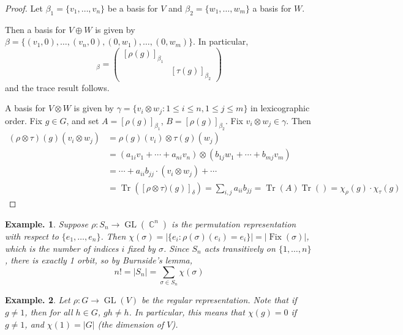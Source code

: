 \documentclass[11pt, a4paper]{memoir}
\DeclareMathOperator{\C}{{\mathbb{C}}}
\theoremstyle{change}
\theoremstyle{plain}
\theoremstyle{nonumberplain}
\newtheorem{example}{Example.}
\newtheorem{proof}{Proof}
\DeclareMathOperator{\Fix}{Fix}
\DeclareMathOperator{\GL}{GL}
\DeclareMathOperator{\Tr}{Tr}
\numberwithin{equation}{section}
\begin{document}
\begin{proof}
    Let $\beta_1=\{v_1,\ldots,v_n\}$ be a basis for $V$ and $\beta_2=\{w_1,\ldots,w_m\}$ a basis for $W$.

    Then a basis for $V\oplus W$ is given by $\beta=\{(v_1,0),\ldots,(v_n,0),(0,w_1),\ldots,(0,w_m)\}$.
    In particular,
    \begin{equation*}
        [(\rho\oplus\tau)(g)]_\beta=
        \begin{pmatrix}
            [\rho(g)]_{\beta_1} & \\
                                & [\tau(g)]_{\beta_2}
        \end{pmatrix}
    \end{equation*}
    and the trace result follows.

    A basis for $V\otimes W$ is given by $\gamma=\{v_i\otimes w_j:1\leq i\leq n,1\leq j\leq m\}$ in lexicographic order.
    Fix $g\in G$, and set $A=[\rho(g)]_{\beta_1}$, $B=[\rho(g)]_{\beta_2}$.
    Fix $v_i\otimes w_j\in\gamma$.
    Then
    \begin{align*}
        (\rho\otimes\tau)(g)(v_i\otimes w_j)&=\rho(g)(v_i)\otimes\tau(g)(w_j)\\
                                            &= (a_{1i}v_1+\cdots+a_{ni}v_n)\otimes(b_{1j}w_1+\cdots+b_{mj}v_m)\\
                                            &= \cdots+a_{ii}b_{jj}\cdot(v_i\otimes w_j)+\cdots\\
                                            &= \Tr([\rho\otimes\tau)(g)]_\delta)=\sum_{i,j}a_{ii}b_{jj}=\Tr(A)\Tr()=\chi_\rho(g)\cdot\chi_\tau(g)
    \end{align*}
\end{proof}
\begin{example}
    Suppose $\rho:S_n\to\GL(\C^n)$ is the permutation representation with respect to $\{e_1,\ldots,e_n\}$.
    Then $\chi(\sigma)=|\{e_i:\rho(\sigma)(e_i)=e_i\}|=|\Fix(\sigma)|$, which is the number of indices $i$ fixed by $\sigma$.
    Since $S_n$ acts transitively on $\{1,\ldots,n\}$, there is exactly 1 orbit, so by Burnside's lemma,
    \begin{equation*}
        n!=|S_n| = \sum_{\sigma\in S_n}\chi(\sigma)
    \end{equation*}
\end{example}
\begin{example}
    Let $\rho:G\to\GL(V)$ be the regular representation.
    Note that if $g\neq 1$, then for all $h\in G$, $gh\neq h$.
    In particular, this means that $\chi(g)=0$ if $g\neq 1$, and $\chi(1)=|G|$ (the dimension of $V$).
\end{example}
\end{document}
